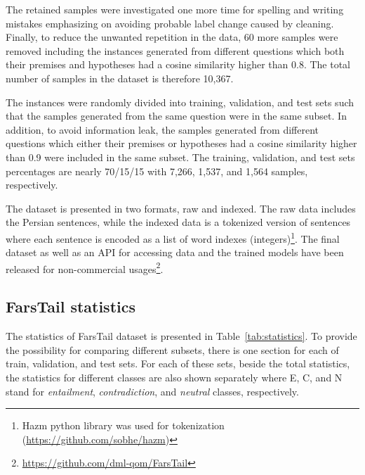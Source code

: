 \documentclass[preprint,12pt]{elsarticle}
\begin{document}
The retained samples were investigated one more time for spelling and writing mistakes emphasizing on avoiding probable label change caused by cleaning. Finally, to reduce the unwanted repetition in the data, 60 more samples were removed including the instances generated from different questions which both their premises and hypotheses had a cosine similarity higher than 0.8. The total number of samples in the dataset is therefore 10,367. 

The instances were randomly divided into training, validation, and test sets such that the samples generated from the same question were in the same subset. In addition, to avoid information leak, the samples generated from different questions which either their premises or hypotheses had a cosine similarity higher than 0.9 were included in the same subset. The training, validation, and test sets percentages are nearly 70/15/15 with 7,266, 1,537, and 1,564 samples, respectively.

The dataset is presented in two formats, raw and indexed. The raw data includes the Persian sentences, while the indexed data is a tokenized version of sentences where each sentence is encoded as a list of word indexes (integers)\footnote{Hazm python library was used for tokenization (\url{https://github.com/sobhe/hazm})}. The final dataset as well as an API for accessing data and the trained models have been released for non-commercial usages\footnote{\url{https://github.com/dml-qom/FarsTail}}. 

\subsection{FarsTail statistics}
\label{subsec:statistics}
The statistics of FarsTail dataset is presented in Table~\ref{tab:statistics}. To provide the possibility for comparing different subsets, there is one section for each of train, validation, and test sets. For each of these sets, beside the total statistics, the statistics for different classes are also shown separately where E, C, and N stand for \textit{entailment}, \textit{contradiction}, and \textit{neutral} classes, respectively.
\end{document}
